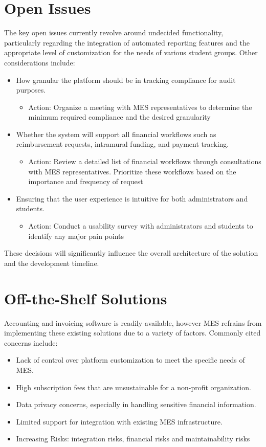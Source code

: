 \documentclass[12pt]{article}
\begin{document}
\newpage

\section{Open Issues}
The key open issues currently revolve around undecided functionality, particularly regarding the integration of automated reporting features and the appropriate level of customization for the needs of various student groups. Other considerations include:
\begin{itemize}
    \item How granular the platform should be in tracking compliance for audit purposes.
    \begin{itemize}
    \item Action: Organize a meeting with MES representatives to determine the minimum required compliance and the desired granularity
    \end{itemize}
    \item Whether the system will support all financial workflows such as reimbursement requests, intramural funding, and payment tracking.
    \begin{itemize}
    \item Action: Review a detailed list of financial workflows through consultations with MES representatives. Prioritize these workflows based on the importance and frequency of request
    \end{itemize}
    \item Ensuring that the user experience is intuitive for both administrators and students.
    \begin{itemize}
    \item Action: Conduct a usability survey with administrators and students to identify any major pain points 
    \end{itemize}
\end{itemize}
These decisions will significantly influence the overall architecture of the solution and the development timeline.


\section{Off-the-Shelf Solutions}

Accounting and invoicing software is readily available, however MES refrains from implementing these existing solutions due to a variety of factors. Commonly cited concerns include:
\begin{itemize}
    \item Lack of control over platform customization to meet the specific needs of MES.
    \item High subscription fees that are unsustainable for a non-profit organization.
    \item Data privacy concerns, especially in handling sensitive financial information.
    \item Limited support for integration with existing MES infrastructure.
    \item Increasing Risks: integration risks, financial risks and maintainability risks
\end{itemize}
\end{document}
